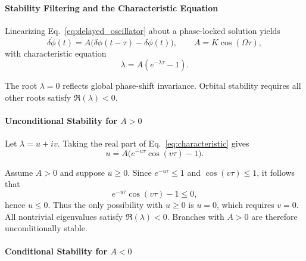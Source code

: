 \documentclass[11pt]{article}
\begin{document}
        \paragraph{Stability Filtering and the Characteristic Equation}

            Linearizing Eq.~\ref{eq:delayed_oscillator} about a phase-locked solution yields
            \begin{equation}
                \delta\dot{\phi}(t)
                =
                A\big(\delta\phi(t-\tau)-\delta\phi(t)\big),
                \qquad
                A=K\cos(\Omega\tau),
                \label{eq:linearized_phi}
            \end{equation}
            with characteristic equation
            \begin{equation}
                \lambda = A\left(e^{-\lambda\tau}-1\right).
                \label{eq:characteristic}
            \end{equation}

            The root $\lambda=0$ reflects global phase-shift invariance.
            Orbital stability requires all other roots satisfy $\Re(\lambda)<0$.

        \paragraph{Unconditional Stability for \texorpdfstring{$A>0$}{A>0}}

            Let $\lambda=u+iv$.
            Taking the real part of Eq.~\ref{eq:characteristic} gives
            \begin{equation}
                u=A\big(e^{-u\tau}\cos(v\tau)-1\big).
                \label{eq:real_part}
            \end{equation}

            Assume $A>0$ and suppose $u\ge0$.
            Since $e^{-u\tau}\le1$ and $\cos(v\tau)\le1$, it follows that
            \[
                e^{-u\tau}\cos(v\tau)-1 \le 0,
            \]
            hence $u\le0$.
            Thus the only possibility with $u\ge0$ is $u=0$, which requires $v=0$.
            All nontrivial eigenvalues satisfy $\Re(\lambda)<0$.
            Branches with $A>0$ are therefore unconditionally stable.

        \paragraph{Conditional Stability for \texorpdfstring{$A<0$}{A<0}}
\end{document}
